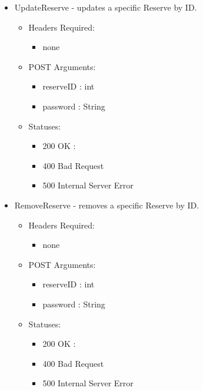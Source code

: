 \begin{itemize}
\begin{itemize}
\begin{itemize}
\begin{itemize}
\begin{itemize}
	\item UpdateReserve - updates a specific Reserve by ID.
        \begin{itemize}
        \item Headers Required:
        \begin{itemize}
              	\item none
        \end{itemize}
        \item POST Arguments:
        \begin{itemize}
              	\item reserveID : int
		\item password : String
        \end{itemize}
        \item Statuses: 
        \begin{itemize}
              	\item 200 OK :
              	\item 400 Bad Request
              	\item 500 Internal Server Error
        \end{itemize}
	    \end{itemize}


	\item RemoveReserve - removes a specific Reserve by ID.
        \begin{itemize}
        \item Headers Required:
        \begin{itemize}
              	\item none
        \end{itemize}
        \item POST Arguments:
        \begin{itemize}
              	\item reserveID : int
		\item password : String
        \end{itemize}
        \item Statuses: 
        \begin{itemize}
              	\item 200 OK : 
              	\item 400 Bad Request
              	\item 500 Internal Server Error
        \end{itemize}
	    \end{itemize}
    \end{itemize}


\end{itemize}
\end{itemize}
\end{itemize}
\end{itemize}
